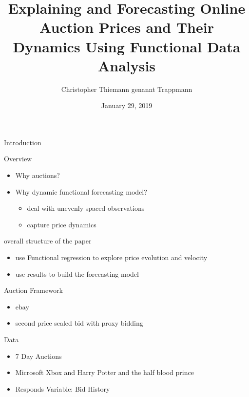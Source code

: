 \documentclass[hyperref={pdfpagelabels=false}]{beamer}
\title{Explaining and Forecasting Online Auction
Prices and Their Dynamics Using
Functional Data Analysis}
\author{Christopher Thiemann genannt Trappmann}
\date{January 29, 2019}
\begin{document}
\begin{frame}
\titlepage
\end{frame}


\begin{frame}
\centering
Introduction
\end{frame}



\begin{frame}{Overview}
\begin{itemize}
    \item Why auctions? %
    \item Why dynamic functional forecasting model?
    \begin{itemize}
        \item deal with unevenly spaced observations
        \item capture price dynamics
    \end{itemize}    
\end{itemize}
overall structure of the paper
\begin{itemize}
    \item use Functional regression to explore price evolution and velocity
    \item use results to build the forecasting model
\end{itemize}
\end{frame}

\begin{frame}{Auction Framework}
\begin{itemize}
    \item ebay
    \item second price sealed bid with proxy bidding
\end{itemize}
Data
\begin{itemize}
    \item 7 Day Auctions
    \item Microsoft Xbox and Harry Potter and the half blood prince
    \item Responds Variable: Bid History
\end{itemize}
\end{frame}
\end{document}
